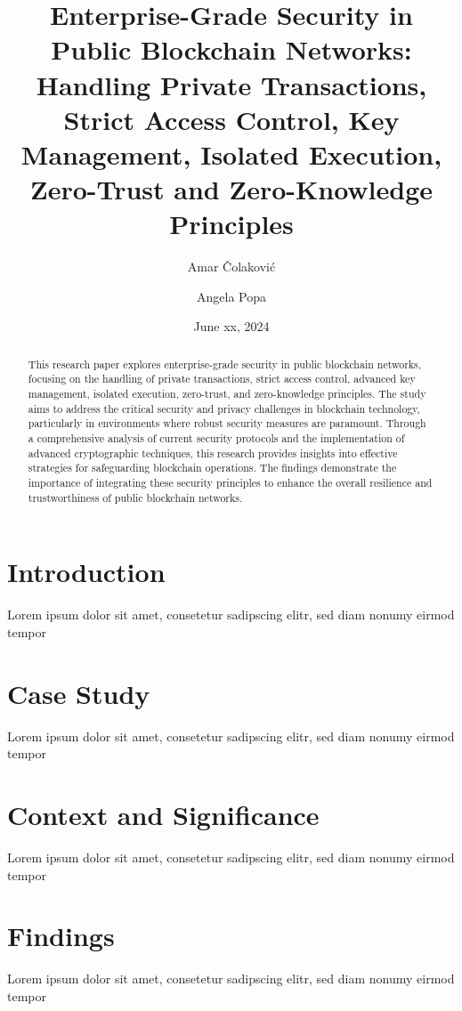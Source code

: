 \documentclass[]{article}
\title{Enterprise-Grade Security in Public Blockchain Networks: Handling Private Transactions, Strict Access Control, Key Management, Isolated Execution, Zero-Trust and Zero-Knowledge Principles }
\author[1]{Amar Čolaković}
\author[1]{Angela Popa}
\affil[1]{LogosLabs}
\date{June xx, 2024}
\begin{document}
\maketitle

\begin{abstract}
This research paper explores enterprise-grade security in public blockchain networks, focusing on the handling of private transactions, strict access control, advanced key management, isolated execution, zero-trust, and zero-knowledge principles. The study aims to address the critical security and privacy challenges in blockchain technology, particularly in environments where robust security measures are paramount. Through a comprehensive analysis of current security protocols and the implementation of advanced cryptographic techniques, this research provides insights into effective strategies for safeguarding blockchain operations. The findings demonstrate the importance of integrating these security principles to enhance the overall resilience and trustworthiness of public blockchain networks.        
\end{abstract}

\tableofcontents
\newpage

\section{Introduction}
Lorem ipsum dolor sit amet, consetetur sadipscing elitr, sed diam nonumy eirmod tempor 

\section{Case Study}
Lorem ipsum dolor sit amet, consetetur sadipscing elitr, sed diam nonumy eirmod tempor 

\section{Context and Significance}
Lorem ipsum dolor sit amet, consetetur sadipscing elitr, sed diam nonumy eirmod tempor 

\section{Findings}
Lorem ipsum dolor sit amet, consetetur sadipscing elitr, sed diam nonumy eirmod tempor 

\end{document}
